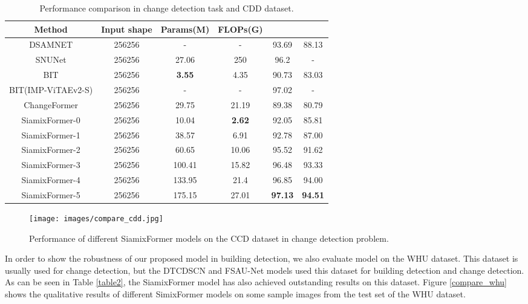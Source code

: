 \documentclass{article}
\begin{document}
\begin{table}[t]
	\begin{center}
		\caption{Performance comparison in change detection task and CDD dataset.}
		\label{table4}
		\begin{tabular}{c|ccccc}
			\hline
			\hline
			Method & Input shape & Params(M) & FLOPs(G) &  &  \\
			\hline
			DSAMNET &256256 & -&- &93.69 & 88.13 \\
			SNUNet & 256256& 27.06& 250 &96.2 & - \\
			BIT  & 256256 & \textbf{3.55}&4.35 &90.73 &83.03  \\
			BIT(IMP-ViTAEv2-S) &256256 &- &- &97.02&-\\
			ChangeFormer  & 256256& 29.75 & 21.19& 89.38 &80.79 \\
			\hline
			SiamixFormer-0 &256256 &10.04 &  \textbf{2.62} &92.05&85.81 \\
			SiamixFormer-1 &256256 & 38.57&6.91  &92.78& 87.00 \\
			SiamixFormer-2 &256256 & 60.65& 10.06 &95.52& 91.62\\
			SiamixFormer-3 &256256 & 100.41& 15.82 &96.48&93.33\\
			SiamixFormer-4 &256256 & 133.95&21.4  &96.85 &94.00 \\
			SiamixFormer-5 &256256 & 175.15& 27.01 &\textbf{97.13}& \textbf{94.51}\\
			\hline
			\hline			
		\end{tabular}  
	\end{center}
\end{table}

\begin{figure*}[t!]
	\begin{center}
		\texttt{[image: images/compare\_cdd.jpg]}
		\caption{Performance of different SiamixFormer models on the CCD dataset in change detection problem.}
		\label{compare_cdd}
	\end{center}
\end{figure*}



In order to show the robustness of our proposed model in building detection, we also evaluate model on the WHU dataset. This dataset is usually used for change detection, but the DTCDSCN and FSAU-Net models used this dataset for building detection and change detection. As can be seen in Table \ref{table2}, the SiamixFormer model has also achieved outstanding results on this dataset. Figure \ref{compare_whu} shows the qualitative results of different SimixFormer models on some sample images from the test set of the WHU dataset.
\end{document}
